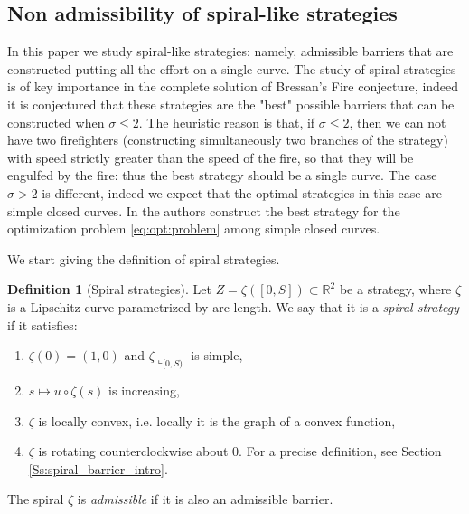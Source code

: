 \documentclass[reqno]{amsart}
\theoremstyle{definition} \newtheorem{definition}{Definition}[section]
\theoremstyle{definition} \newtheorem{remark}[definition]{Remark}
\theoremstyle{plain} \newtheorem{lemma}[definition]{Lemma}
\theoremstyle{plain} \newtheorem{proposition}[definition]{Proposition}
\theoremstyle{plain} \newtheorem{theorem}[definition]{Theorem}
\theoremstyle{plain} \newtheorem{corollary}[definition]{Corollary}
\theoremstyle{definition} \newtheorem{example}[definition]{Example}
\theoremstyle{plain} \newtheorem{claim}[clai]{Claim}
\theoremstyle{definition} \newtheorem{assumption}[definition]{Assumption}
\theoremstyle{definition} \newtheorem{observation}[definition]{Observation}
\newcommand{\R}{\mathbb{R}}
\newcommand{\1}{\mathbbm 1}
\newcommand{\rest}{\llcorner}
\numberwithin{equation}{section} %
\theoremstyle{plain} \newtheorem*{theorem*}{Theorem}
\theoremstyle{plain} \newtheorem{mthm}[maintheorem]{Main Theorem}
\theoremstyle{plain} \newtheorem*{mthm*}{Main Theorem}
\theoremstyle{plain} \newtheorem*{conjecture*}{Conjecture}
\theoremstyle{plain} \newtheorem{conjecture}[definition]{Conjecture}
\theoremstyle{plain} \newtheorem*{problem*}{Problem}
\begin{document}
\subsection{Non admissibility of spiral-like strategies}
\label{Ss:spiral_intro}


In this paper we study spiral-like strategies: namely, admissible barriers that are constructed putting all the effort on a single curve. The study of spiral strategies is of key importance in the  complete solution of Bressan's Fire conjecture, indeed it is conjectured that these strategies are the "best" possible barriers that can be constructed when $\sigma\leq 2$. The heuristic reason is that, if $\sigma\leq 2$, then we can not have two firefighters (constructing simultaneously two branches of the strategy) with speed strictly greater than the speed of the fire, so that they will be engulfed by the fire: thus the best strategy should be a single curve. The case $\sigma>2$ is different, indeed we expect that the optimal strategies in this case are simple closed curves. In \cite{Bressan_isotropic} the authors construct the best strategy for the optimization problem \ref{eq:opt:problem} among simple closed curves.

\medskip

We start giving the definition of spiral strategies.

\begin{definition}[Spiral strategies]
\label{Def:spiral_barrier_intro}
Let $Z = \zeta([0,S]) \subset \R^2$ be a strategy, where $\zeta$ is a Lipschitz curve parametrized by arc-length. We say that it is a \emph{spiral strategy} if it satisfies:
\begin{enumerate}
\item $\zeta(0) = (1,0)$ and $\zeta \rest_{[0,S)}$ is simple,
\item $s \mapsto u \circ \zeta(s)$ is increasing,
\item $\zeta$ is locally convex, i.e. locally it is the graph of a convex function,
\item \label{Point:4_intro_def_spiral} %
$\zeta$ is rotating counterclockwise about $0$. For a precise definition, see Section \ref{Ss:spiral_barrier_intro}.
\end{enumerate}
The spiral $\zeta$ is \emph{admissible} if it is also an admissible barrier.
\end{definition}
\end{document}
